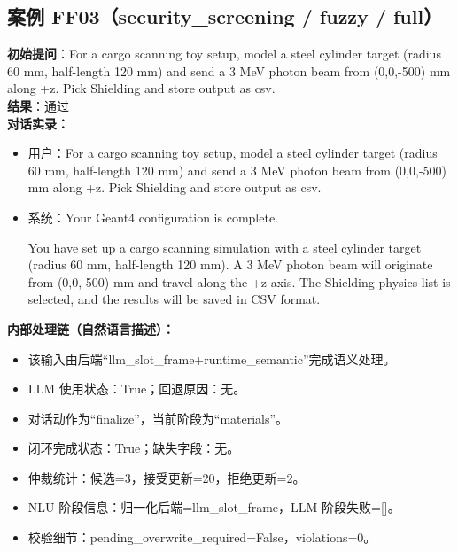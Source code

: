 \documentclass[11pt]{ctexart}
\begin{document}
\subsection{案例 FF03（security\_screening / fuzzy / full）}
\textbf{初始提问}：For a cargo scanning toy setup, model a steel cylinder target (radius 60 mm, half-length 120 mm) and send a 3 MeV photon beam from (0,0,-500) mm along +z. Pick Shielding and store output as csv.\\
\textbf{结果}：通过\\
\textbf{对话实录：}
\begin{itemize}
\item 用户：For a cargo scanning toy setup, model a steel cylinder target (radius 60 mm, half-length 120 mm) and send a 3 MeV photon beam from (0,0,-500) mm along +z. Pick Shielding and store output as csv.
\item 系统：Your Geant4 configuration is complete.

You have set up a cargo scanning simulation with a steel cylinder target (radius 60 mm, half-length 120 mm). A 3 MeV photon beam will originate from (0,0,-500) mm and travel along the +z axis. The Shielding physics list is selected, and the results will be saved in CSV format.
\end{itemize}
\textbf{内部处理链（自然语言描述）：}
\begin{itemize}
\item 该输入由后端“llm\_slot\_frame+runtime\_semantic”完成语义处理。
\item LLM 使用状态：True；回退原因：无。
\item 对话动作为“finalize”，当前阶段为“materials”。
\item 闭环完成状态：True；缺失字段：无。
\item 仲裁统计：候选=3，接受更新=20，拒绝更新=2。
\item NLU 阶段信息：归一化后端=llm\_slot\_frame，LLM 阶段失败=[]。
\item 校验细节：pending\_overwrite\_required=False，violations=0。
\end{itemize}
\end{document}
